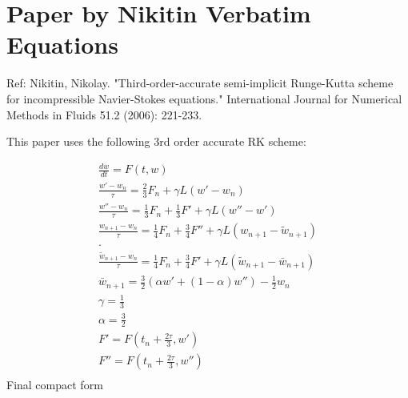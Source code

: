\documentclass[11pt]{article}
\begin{document}
\section{Paper by Nikitin Verbatim Equations}
Ref: Nikitin, Nikolay. "Third-order-accurate semi-implicit Runge-Kutta scheme for incompressible Navier-Stokes equations." International Journal for Numerical Methods in Fluids 51.2 (2006): 221-233.

This paper uses the following 3rd order accurate RK scheme:

\begin{equation}\begin{aligned}
  \frac{dw}{dt} = F(t,w) \\
  \frac{w'-w_n}{\tau} = \frac{2}{3} F_n + \gamma L(w' - w_n) \\
  \frac{w''-w_n}{\tau} = \frac{1}{3} F_n + \frac{1}{3} F' + \gamma L(w'' - w') \\
  \frac{w_{n+1}        -w_n}{\tau} = \frac{1}{4} F_n + \frac{3}{4} F'' + \gamma L(w_{n+1} - \tilde{w}_{n+1}) \\
  . \\
  \frac{\tilde{w}_{n+1}-w_n}{\tau} = \frac{1}{4} F_n + \frac{3}{4} F'  + \gamma L(\tilde{w}_{n+1} - \bar{w}_{n+1}) \\
  \bar{w}_{n+1} = \frac{3}{2} (\alpha w' + (1-\alpha) w'') - \frac{1}{2} w_n \\
  \gamma = \frac{1}{3} \\
  \alpha = \frac{3}{2} \\
  F' = F(t_n + \frac{2\tau}{3},w') \\
  F'' = F(t_n + \frac{2\tau}{3},w'') \\
\end{aligned}\end{equation}
Final compact form
\end{document}
